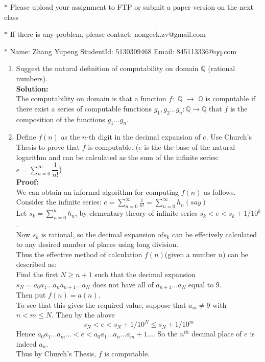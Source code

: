 \documentclass[12pt,a4paper]{article}
\theoremstyle{definition}
\numberwithin{equation}{section}
\numberwithin{figure}{section}
\begin{document}
\noindent{}
\begin{center}
\footnotesize{\color{red}$*$ Please upload your assignment to FTP or submit a paper version on the next class}

\footnotesize{\color{red}$*$ If there is any problem, please contact: nongeek.zv@gmail.com }

\footnotesize{\color{blue}$*$ Name: Zhang Yupeng \quad StudentId: 5130309468 \quad Email: 845113336@qq.com}
\end{center}


\begin{enumerate}%

  \item Suggest the natural definition of computability on domain $\mathbb{Q}$ (rational numbers).\\
\textbf{Solution:}\\
The computability on domain  is that a function $f:$ $\mathbb{Q}$ $\rightarrow$ $\mathbb{Q}$ is computable if there exist a series of computable functions $g_1,g_2...g_n: $$\mathbb{Q}$$ \rightarrow$$ \mathbb{Q}$ that $f$ is the composition of the functions $g_1...g_n$.\\
 
 \item Define $f(n)$ as the $n$-th digit in the decimal expansion of $e$. Use Church's Thesis to prove that $f$ is computable. ($e$ is the the base of the natural logarithm and can be calculated as the sum of the infinite series: $e = \sum\limits_{n=0}^{\infty}\dfrac{1}{n!}$)\\
\textbf{Proof:}\\
We can obtain an informal algorithm for computing $f(n)$ as follows.\\
Consider the infinite series: $e = \sum_{n=0}^{\infty} \frac{1}{n!} = \sum_{n=0}^{\infty}h_n(say)$\\
Let $s_k = \sum_{n=0}^{k}h_n$, by elementary theory of infinite series $s_k < e < s_k + 1/10^k$.\\
Now $s_k$ is rational, so the decimal expansion of$s_k$ can be effecively calculated to any desired number of places using long division.\\
Thus the effective method of calculation $f(n)$(given a number $n$) can be described as:\\
Find the first $N \geq n+1 $ such that the decimal expansion $s_N = a_0a_1...a_na_{n+1}...a_N$ does not have all of $a_{n+1}...a_N$ equal to 9.\\
Then put $f(n) = a(n)$.\\
To see that this gives the required value, suppose that $a_m \neq 9$ with $n < m \leq N$. Then by the above
$$s_N < e < s_N+1/10^N \leq s_N +1/10^m$$
Hence $a_0a_1...a_m... < e < a_0a_1...a_n...a_m+1...$. So the $n^{th}$ decimal place of $e$ is indeed $a_n$.\\
Thus by Church's Thesis, $f$ is computable.\\



\end{enumerate}
\end{document}
